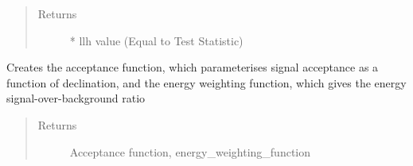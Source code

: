 \documentclass[letterpaper,10pt,english]{sphinxmanual}
\begin{document}
\begin{fulllineitems}
\begin{fulllineitems}
\begin{quote}
\begin{description}
\begin{itemize}
\end{itemize}

\item[{Returns}]  * llh value (Equal to Test Statistic)

\end{description}\end{quote}

\end{fulllineitems}


\begin{fulllineitems}
\label{\detokenize{index:flarestack.core.llh.FixedEnergyLLH.create_acceptance_function}}
\end{fulllineitems}


\begin{fulllineitems}
\label{\detokenize{index:flarestack.core.llh.FixedEnergyLLH.create_energy_functions}}
Creates the acceptance function, which parameterises signal
acceptance as a function of declination, and the energy weighting
function, which gives the energy signal-over-background ratio
\begin{quote}\begin{description}
\item[{Returns}] \leavevmode
Acceptance function, energy\_weighting\_function

\end{description}\end{quote}

\end{fulllineitems}


\begin{fulllineitems}
\label{\detokenize{index:flarestack.core.llh.FixedEnergyLLH.create_energy_weighting_function}}
\end{fulllineitems}


\end{fulllineitems}
\end{document}
